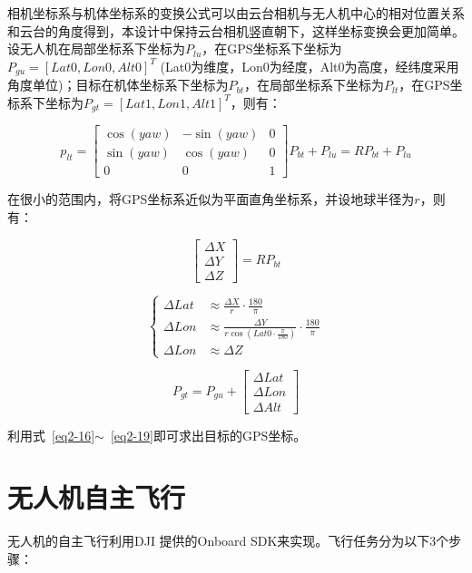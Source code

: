 相机坐标系与机体坐标系的变换公式可以由云台相机与无人机中心的相对位置关系和云台的角度得到，本设计中保持云台相机竖直朝下，这样坐标变换会更加简单。设无人机在局部坐标系下坐标为$P_{lu}$，在GPS坐标系下坐标为$P_{gu}=\left[Lat0, Lon0, Alt0\right]^T$ (Lat0为维度，Lon0为经度，Alt0为高度，经纬度采用角度单位)；目标在机体坐标系下坐标为$P_{bt}$，在局部坐标系下坐标为$P_{lt}$，在GPS坐标系下坐标为$P_{gt}=\left[Lat1,Lon1,Alt1\right]^T$，则有：

\begin{equation}\label{eq2-16}
	p_{lt} = \left[\begin{matrix} \cos(yaw) & -\sin(yaw) & 0 \\
	\sin(yaw) & \cos(yaw) & 0 \\ 0 & 0 & 1 \end{matrix}\right] P_{bt} + P_{lu} 
	= R P_{bt} + P_{lu} 
\end{equation}

在很小的范围内，将GPS坐标系近似为平面直角坐标系，并设地球半径为$r$，则有：

\begin{equation}\label{eq2-17}
	\left[\begin{array}{c} \Delta X \\ \Delta Y \\ \Delta Z \end{array}\right] = R P_{bt} 
\end{equation}

\begin{equation}\label{eq2-18}
	\left\{ \begin{aligned}
		\Delta Lat & \approx \frac{\Delta X}{r} \cdot \frac{180}{\pi} \\
		\Delta Lon & \approx \frac{\Delta Y}{r \cos(Lat0 \cdot \frac{\pi}{180})} \cdot \frac{180}{\pi} \\
		\Delta Lon & \approx \Delta Z
	\end{aligned}
	\right.
\end{equation}

\begin{equation}\label{eq2-19}
	P_{gt} = P_{gu} + \left[ \begin{array}{c} \Delta Lat \\ \Delta Lon \\ \Delta Alt \end{array}\right]
\end{equation}

利用式~\eqref{eq2-16}$\sim$~\eqref{eq2-19}即可求出目标的GPS坐标。

\section{无人机自主飞行}
无人机的自主飞行利用DJI 提供的Onboard SDK来实现。飞行任务分为以下3个步骤：

